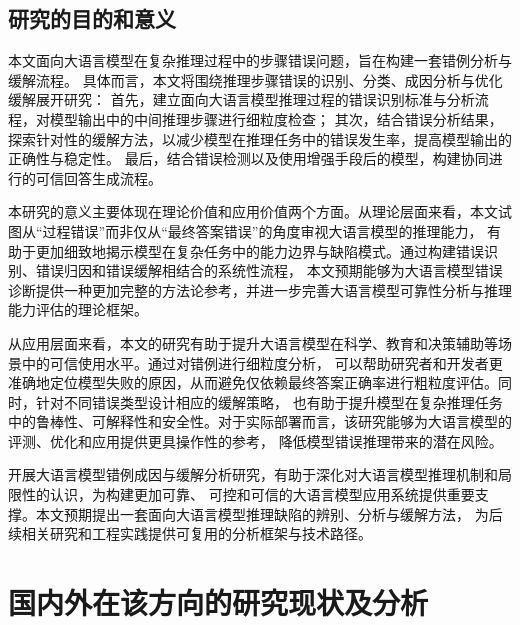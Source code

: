 \subsection{研究的目的和意义}

本文面向大语言模型在复杂推理过程中的步骤错误问题，旨在构建一套错例分析与缓解流程。
具体而言，本文将围绕推理步骤错误的识别、分类、成因分析与优化缓解展开研究：
首先，建立面向大语言模型推理过程的错误识别标准与分析流程，对模型输出中的中间推理步骤进行细粒度检查；
其次，结合错误分析结果，探索针对性的缓解方法，以减少模型在推理任务中的错误发生率，提高模型输出的正确性与稳定性。
最后，结合错误检测以及使用增强手段后的模型，构建协同进行的可信回答生成流程。

本研究的意义主要体现在理论价值和应用价值两个方面。从理论层面来看，本文试图从“过程错误”而非仅从“最终答案错误”的角度审视大语言模型的推理能力，
有助于更加细致地揭示模型在复杂任务中的能力边界与缺陷模式。通过构建错误识别、错误归因和错误缓解相结合的系统性流程，
本文预期能够为大语言模型错误诊断提供一种更加完整的方法论参考，并进一步完善大语言模型可靠性分析与推理能力评估的理论框架。

从应用层面来看，本文的研究有助于提升大语言模型在科学、教育和决策辅助等场景中的可信使用水平。通过对错例进行细粒度分析，
可以帮助研究者和开发者更准确地定位模型失败的原因，从而避免仅依赖最终答案正确率进行粗粒度评估。同时，针对不同错误类型设计相应的缓解策略，
也有助于提升模型在复杂推理任务中的鲁棒性、可解释性和安全性。对于实际部署而言，该研究能够为大语言模型的评测、优化和应用提供更具操作性的参考，
降低模型错误推理带来的潜在风险。

开展大语言模型错例成因与缓解分析研究，有助于深化对大语言模型推理机制和局限性的认识，为构建更加可靠、
可控和可信的大语言模型应用系统提供重要支撑。本文预期提出一套面向大语言模型推理缺陷的辨别、分析与缓解方法，
为后续相关研究和工程实践提供可复用的分析框架与技术路径。

\section{国内外在该方向的研究现状及分析}
